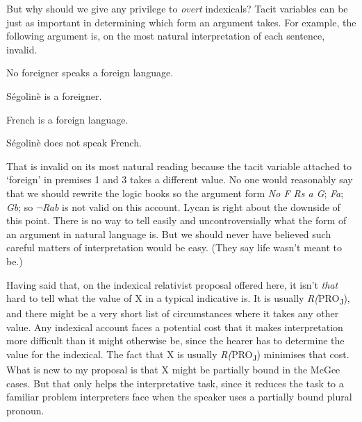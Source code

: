 But why should we give any privilege to \textit{overt }indexicals? Tacit variables can be just as important in determining which form an argument takes. For example, the following argument is, on the most natural interpretation of each sentence, invalid.

\renewcommand{\labelenumi}{(\arabic{enumi})}
\begin{enumerate*}
\setcounter{enumi}{0}
\item No foreigner speaks a foreign language.

\item S\'{e}golin\`{e} is a foreigner.

\item French is a foreign language.

\item S\'{e}golin\`{e} does not speak French.
\end{enumerate*}

\noindent That is invalid on its most natural reading because the tacit variable attached to `foreign' in premises 1 and 3 takes a different value. No one would reasonably say that we should rewrite the logic books so the argument form \textit{No F Rs a G}; \textit{Fa}; \textit{Gb}; so \(\neg\){}\textit{Rab} is not valid on this account. Lycan is right about the downside of this point. There is no way to tell easily and uncontroversially what the form of an argument in natural language is. But we should never have believed such careful matters of interpretation would be easy. (They say life wasn't meant to be.)

Having said that, on the indexical relativist proposal offered here, it isn't \textit{that} hard to tell what the value of X in a typical indicative is. It is usually \textit{R(}PRO\textsubscript{J}), and there might be a very short list of circumstances where it takes any other value. Any indexical account faces a potential cost that it makes interpretation more difficult than it might otherwise be, since the hearer has to determine the value for the indexical. The fact that X is usually \textit{R(}PRO\textsubscript{J}) minimises that cost. What is new to my proposal is that X might be partially bound in the McGee cases. But that only helps the interpretative task, since it reduces the task to a familiar problem interpreters face when the speaker uses a partially bound plural pronoun.

